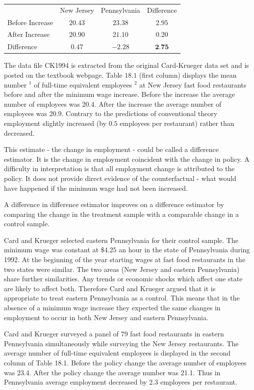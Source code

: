 \documentclass[10pt]{article}
\begin{document}
\begin{tabular}{lccc}
\hline\hline
 & New Jersey & Pennsylvania & Difference \\
\cline { 2 - 4 }
Before Increase & $20.43$ & $23.38$ & $2.95$ \\
After Increase & $20.90$ & $21.10$ & $0.20$ \\
Difference & $0.47$ & $-2.28$ & $\mathbf{2 . 7 5}$ \\
\hline
\end{tabular}

The data file CK1994 is extracted from the original Card-Krueger data set and is posted on the textbook webpage. Table $18.1$ (first column) displays the mean number ${ }^{1}$ of full-time equivalent employees ${ }^{2}$ at New Jersey fast food restaurants before and after the minimum wage increase. Before the increase the average number of employees was 20.4. After the increase the average number of employees was 20.9. Contrary to the predictions of conventional theory employment slightly increased (by $0.5$ employees per restaurant) rather than decreased.

This estimate - the change in employment - could be called a difference estimator. It is the change in employment coincident with the change in policy. A difficulty in interpretation is that all employment change is attributed to the policy. It does not provide direct evidence of the counterfactual - what would have happened if the minimum wage had not been increased.

A difference in difference estimator improves on a difference estimator by comparing the change in the treatment sample with a comparable change in a control sample.

Card and Krueger selected eastern Pennsylvania for their control sample. The minimum wage was constant at $\$ 4.25$ an hour in the state of Pennsylvania during 1992. At the beginning of the year starting wages at fast food restaurants in the two states were similar. The two areas (New Jersey and eastern Pennsylvania) share further similarities. Any trends or economic shocks which affect one state are likely to affect both. Therefore Card and Krueger argued that it is appropriate to treat eastern Pennsylvania as a control. This means that in the absence of a minimum wage increase they expected the same changes in employment to occur in both New Jersey and eastern Pennsylvania.

Card and Krueger surveyed a panel of 79 fast food restaurants in eastern Pennsylvania simultaneously while surveying the New Jersey restaurants. The average number of full-time equivalent employees is displayed in the second column of Table 18.1. Before the policy change the average number of employees was 23.4. After the policy change the average number was 21.1. Thus in Pennsylvania average employment decreased by $2.3$ employees per restaurant.
\end{document}
